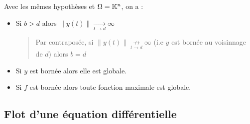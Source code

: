 \begin{theorem}[Explosion]
    Avec les mêmes hypothèses et $\Omega = \mathbb{K}^n$, on a : 
    \begin{itemize}
        \item Si $b > d$ alors $ \| y(t) \| \underset{t \to d}{\longrightarrow} \infty $ 
            \begin{quote}
                Par contraposée, si $ \| y(t) \| \underset{t \to d}{ \not \longrightarrow} \infty $ 
                (i.e $y$ est bornée au voisinnage de $d$) alors $b = d$
            \end{quote}
        \item Si $y$ est bornée alors elle est globale. 
        \item Si $f$ est bornée alors toute fonction maximale est globale. 
    \end{itemize}
\end{theorem}


\subsection{Flot d'une équation différentielle}

